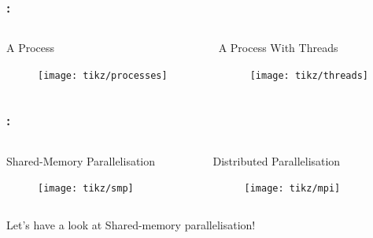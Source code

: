 \documentclass[9pt,xcolor=table]{beamer}
\begin{document}
\begin{frame}
\frametitle{\insertsectionhead{}: \insertsubsectionhead{}}
\begin{columns}[c]
  \begin{column}{.47\textwidth}
    \begin{block}{A Process}
      \begin{figure}[htb]
        \texttt{[image: tikz/processes]}
      \end{figure}
    \end{block}
  \end{column}
    \begin{column}{.47\textwidth}
      \begin{block}{A Process With Threads}
      \begin{figure}[htb]
        \texttt{[image: tikz/threads]}
      \end{figure}
    \end{block}
    \end{column}
  \end{columns}
\end{frame}

\begin{frame}
\frametitle{\insertsectionhead{}: \insertsubsectionhead{}}
\begin{columns}[c]
  \begin{column}{.47\textwidth}
    \begin{block}{Shared-Memory Parallelisation}
      \begin{figure}[htb]
        \texttt{[image: tikz/smp]}
      \end{figure}
    \end{block}
  \end{column}
    \begin{column}{.47\textwidth}
      \begin{block}{Distributed Parallelisation}
      \begin{figure}[htb]
        \texttt{[image: tikz/mpi]}
      \end{figure}
    \end{block}
    \end{column}
  \end{columns}
\pause
\begin{center}
  \Large
  Let's have a look at Shared-memory parallelisation!
\end{center}
\end{frame}
\end{document}
